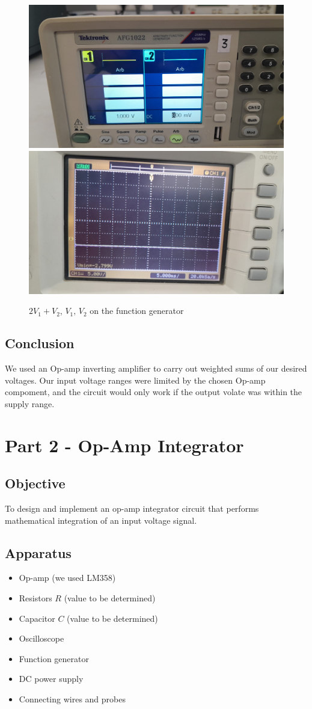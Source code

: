 \documentclass[a4paper,12pt]{article}
\begin{document}
\begin{figure}[H]
	\centering
	\includegraphics[width = 0.7\columnwidth]{figs/ex1f4.jpg}
	\includegraphics[width = 0.7\columnwidth]{figs/ex4f5.jpg}
	\caption{$2V_1+V_2$, $V_1,\,V_2$ on the function generator}
\end{figure}
\subsection{Conclusion}
We used an Op-amp inverting amplifier to carry out weighted sums of our desired voltages. Our input voltage ranges were limited by the chosen Op-amp compoment, and the circuit would only work if the output volate was within the supply range.
\section{Part 2 - Op-Amp Integrator}

\subsection{Objective}
To design and implement an op-amp integrator circuit that performs mathematical integration of an input voltage signal.

\subsection{Apparatus}
\begin{itemize}
    \item Op-amp (we used LM358)
    \item Resistors \( R \) (value to be determined)
    \item Capacitor \( C \) (value to be determined)
    \item Oscilloscope
    \item Function generator
    \item DC power supply
    \item Connecting wires and probes
\end{itemize}
\end{document}

